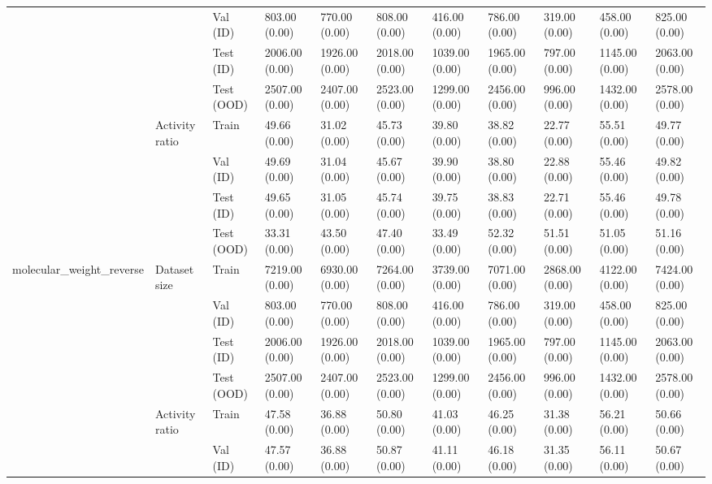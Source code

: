 \begin{tabular}{lllllllllll}
 &  & Val (ID) & 803.00 (0.00) & 770.00 (0.00) & 808.00 (0.00) & 416.00 (0.00) & 786.00 (0.00) & 319.00 (0.00) & 458.00 (0.00) & 825.00 (0.00) \\
 &  & Test (ID) & 2006.00 (0.00) & 1926.00 (0.00) & 2018.00 (0.00) & 1039.00 (0.00) & 1965.00 (0.00) & 797.00 (0.00) & 1145.00 (0.00) & 2063.00 (0.00) \\
 &  & Test (OOD) & 2507.00 (0.00) & 2407.00 (0.00) & 2523.00 (0.00) & 1299.00 (0.00) & 2456.00 (0.00) & 996.00 (0.00) & 1432.00 (0.00) & 2578.00 (0.00) \\
\cline{2-11}
 & \multirow[t]{4}{*}{Activity ratio} & Train & 49.66 (0.00) & 31.02 (0.00) & 45.73 (0.00) & 39.80 (0.00) & 38.82 (0.00) & 22.77 (0.00) & 55.51 (0.00) & 49.77 (0.00) \\
 &  & Val (ID) & 49.69 (0.00) & 31.04 (0.00) & 45.67 (0.00) & 39.90 (0.00) & 38.80 (0.00) & 22.88 (0.00) & 55.46 (0.00) & 49.82 (0.00) \\
 &  & Test (ID) & 49.65 (0.00) & 31.05 (0.00) & 45.74 (0.00) & 39.75 (0.00) & 38.83 (0.00) & 22.71 (0.00) & 55.46 (0.00) & 49.78 (0.00) \\
 &  & Test (OOD) & 33.31 (0.00) & 43.50 (0.00) & 47.40 (0.00) & 33.49 (0.00) & 52.32 (0.00) & 51.51 (0.00) & 51.05 (0.00) & 51.16 (0.00) \\
\cline{1-11} \cline{2-11}
\multirow[t]{8}{*}{molecular_weight_reverse} & \multirow[t]{4}{*}{Dataset size} & Train & 7219.00 (0.00) & 6930.00 (0.00) & 7264.00 (0.00) & 3739.00 (0.00) & 7071.00 (0.00) & 2868.00 (0.00) & 4122.00 (0.00) & 7424.00 (0.00) \\
 &  & Val (ID) & 803.00 (0.00) & 770.00 (0.00) & 808.00 (0.00) & 416.00 (0.00) & 786.00 (0.00) & 319.00 (0.00) & 458.00 (0.00) & 825.00 (0.00) \\
 &  & Test (ID) & 2006.00 (0.00) & 1926.00 (0.00) & 2018.00 (0.00) & 1039.00 (0.00) & 1965.00 (0.00) & 797.00 (0.00) & 1145.00 (0.00) & 2063.00 (0.00) \\
 &  & Test (OOD) & 2507.00 (0.00) & 2407.00 (0.00) & 2523.00 (0.00) & 1299.00 (0.00) & 2456.00 (0.00) & 996.00 (0.00) & 1432.00 (0.00) & 2578.00 (0.00) \\
\cline{2-11}
 & \multirow[t]{4}{*}{Activity ratio} & Train & 47.58 (0.00) & 36.88 (0.00) & 50.80 (0.00) & 41.03 (0.00) & 46.25 (0.00) & 31.38 (0.00) & 56.21 (0.00) & 50.66 (0.00) \\
 &  & Val (ID) & 47.57 (0.00) & 36.88 (0.00) & 50.87 (0.00) & 41.11 (0.00) & 46.18 (0.00) & 31.35 (0.00) & 56.11 (0.00) & 50.67 (0.00) \\

\end{tabular}
